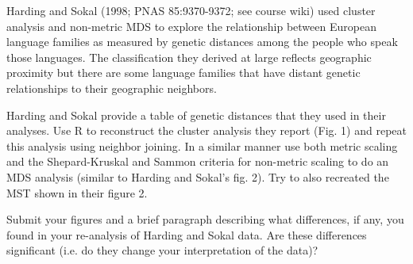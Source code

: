 \medskip
\begin{assignment}
Harding and Sokal (1998; PNAS 85:9370-9372; see course wiki) used cluster analysis and non-metric MDS to explore the relationship between European language families as measured by genetic distances among the people who speak those languages.  The classification they derived at large reflects geographic proximity but there are some language families that have distant genetic relationships to their geographic neighbors.

\medskip
Harding and Sokal provide a table of genetic distances that they used in their analyses. Use R to reconstruct the cluster analysis they report (Fig. 1) and repeat this analysis using neighbor joining. In a similar manner use both metric scaling and the Shepard-Kruskal and Sammon criteria for non-metric scaling to do an MDS analysis (similar to Harding and Sokal's fig. 2).  Try to also recreated the MST shown in their figure 2.

\medskip
Submit your figures and a brief paragraph describing what differences, if any, you found in your re-analysis of Harding and Sokal data. Are these differences significant (i.e. do they change your interpretation of the data)?

\end{assignment}




